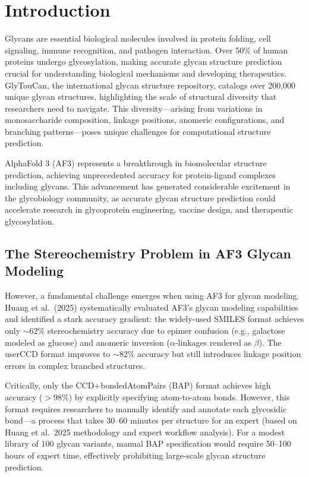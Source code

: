 \documentclass[11pt,a4paper]{article}
\begin{document}
\section{Introduction}

Glycans are essential biological molecules involved in protein folding, cell signaling, immune recognition, and pathogen interaction. Over 50\% of human proteins undergo glycosylation, making accurate glycan structure prediction crucial for understanding biological mechanisms and developing therapeutics. GlyTouCan, the international glycan structure repository, catalogs over 200,000 unique glycan structures, highlighting the scale of structural diversity that researchers need to navigate. This diversity---arising from variations in monosaccharide composition, linkage positions, anomeric configurations, and branching patterns---poses unique challenges for computational structure prediction.

AlphaFold 3 (AF3) represents a breakthrough in biomolecular structure prediction, achieving unprecedented accuracy for protein-ligand complexes including glycans. This advancement has generated considerable excitement in the glycobiology community, as accurate glycan structure prediction could accelerate research in glycoprotein engineering, vaccine design, and therapeutic glycosylation.

\subsection{The Stereochemistry Problem in AF3 Glycan Modeling}

However, a fundamental challenge emerges when using AF3 for glycan modeling. Huang et al.\ (2025) systematically evaluated AF3's glycan modeling capabilities and identified a stark accuracy gradient: the widely-used SMILES format achieves only $\sim$62\% stereochemistry accuracy due to epimer confusion (e.g., galactose modeled as glucose) and anomeric inversion ($\alpha$-linkages rendered as $\beta$). The userCCD format improves to $\sim$82\% accuracy but still introduces linkage position errors in complex branched structures.

Critically, only the CCD+bondedAtomPairs (BAP) format achieves high accuracy ($>$98\%) by explicitly specifying atom-to-atom bonds. However, this format requires researchers to manually identify and annotate each glycosidic bond---a process that takes 30--60 minutes per structure for an expert (based on Huang et al.\ 2025 methodology and expert workflow analysis). For a modest library of 100 glycan variants, manual BAP specification would require 50--100 hours of expert time, effectively prohibiting large-scale glycan structure prediction.
\end{document}
